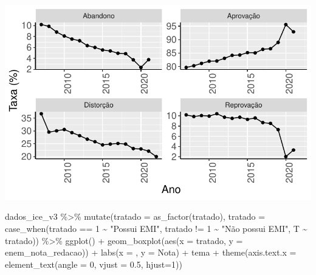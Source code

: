 \documentclass[
  letterpaper,
  DIV=11,
  numbers=noendperiod]{scrartcl}
\newenvironment{Shaded}{\begin{snugshade}}{\end{snugshade}}
\newcommand{\AttributeTok}[1]{\textcolor[rgb]{0.40,0.45,0.13}{#1}}
\newcommand{\DecValTok}[1]{\textcolor[rgb]{0.68,0.00,0.00}{#1}}
\newcommand{\FloatTok}[1]{\textcolor[rgb]{0.68,0.00,0.00}{#1}}
\newcommand{\FunctionTok}[1]{\textcolor[rgb]{0.28,0.35,0.67}{#1}}
\newcommand{\NormalTok}[1]{\textcolor[rgb]{0.00,0.23,0.31}{#1}}
\newcommand{\SpecialCharTok}[1]{\textcolor[rgb]{0.37,0.37,0.37}{#1}}
\newcommand{\StringTok}[1]{\textcolor[rgb]{0.13,0.47,0.30}{#1}}
\begin{document}
\includegraphics{script_files/figure-latex/unnamed-chunk-8-2.pdf}

\begin{Shaded}
\begin{Highlighting}[]
\NormalTok{dados\_ice\_v3 }\SpecialCharTok{\%\textgreater{}\%} 
  \FunctionTok{mutate}\NormalTok{(}\AttributeTok{tratado =} \FunctionTok{as\_factor}\NormalTok{(tratado),}
    \AttributeTok{tratado =} \FunctionTok{case\_when}\NormalTok{(tratado }\SpecialCharTok{==} \DecValTok{1} \SpecialCharTok{\textasciitilde{}} \StringTok{"Possui EMI"}\NormalTok{,}
\NormalTok{                        tratado }\SpecialCharTok{!=} \DecValTok{1} \SpecialCharTok{\textasciitilde{}} \StringTok{"Não possui EMI"}\NormalTok{,}
\NormalTok{                        T }\SpecialCharTok{\textasciitilde{}}\NormalTok{ tratado)) }\SpecialCharTok{\%\textgreater{}\%} 
  \FunctionTok{ggplot}\NormalTok{() }\SpecialCharTok{+}
  \FunctionTok{geom\_boxplot}\NormalTok{(}\FunctionTok{aes}\NormalTok{(}\AttributeTok{x =}\NormalTok{ tratado, }\AttributeTok{y =}\NormalTok{ enem\_nota\_redacao)) }\SpecialCharTok{+}
  \FunctionTok{labs}\NormalTok{(}\AttributeTok{x =}  \StringTok{\textquotesingle{}\textquotesingle{}}\NormalTok{, }\AttributeTok{y =} \StringTok{\textquotesingle{}Nota\textquotesingle{}}\NormalTok{) }\SpecialCharTok{+}
\NormalTok{  tema }\SpecialCharTok{+}
  \FunctionTok{theme}\NormalTok{(}\AttributeTok{axis.text.x =} \FunctionTok{element\_text}\NormalTok{(}\AttributeTok{angle =} \DecValTok{0}\NormalTok{, }\AttributeTok{vjust =} \FloatTok{0.5}\NormalTok{, }\AttributeTok{hjust=}\DecValTok{1}\NormalTok{))}
\end{Highlighting}
\end{Shaded}
\end{document}
